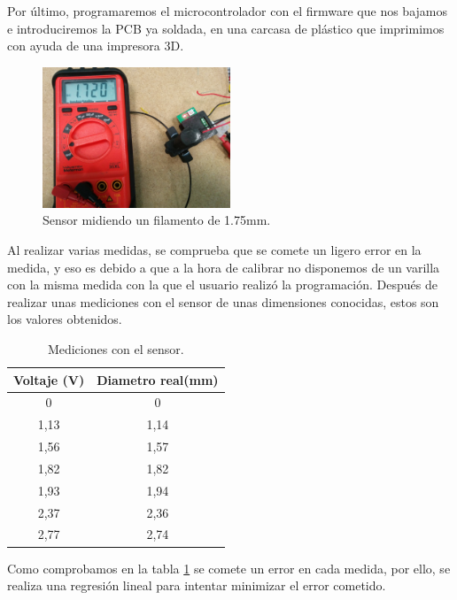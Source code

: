 Por último, programaremos el microcontrolador con el firmware que nos bajamos e introduciremos la PCB ya soldada, en una carcasa de plástico que imprimimos con ayuda de una impresora 3D.
\begin{figure}[H]
    \centering
    \includegraphics[width=0.5\textwidth]{images/sensor/IMG_20150417_134451.jpg}
    \caption{Sensor midiendo un filamento de 1.75mm.}
    \label{fig:sens_midiendo}
\end{figure}

Al realizar varias medidas, se comprueba que se comete un ligero error en la medida, y eso es debido a que a la hora de calibrar no disponemos de un varilla con la misma medida con la que el usuario realizó la programación. Después de realizar unas mediciones con el sensor de unas dimensiones conocidas, estos son los valores obtenidos.

\begin{table}[H]
    \centering

    \begin{tabular}{cc}
        {\bf Voltaje (V)} & {\bf Diametro real(mm)} \\ \hline
        0                 & 0                       \\
        1,13              & 1,14                    \\
        1,56              & 1,57                    \\
        1,82              & 1,82                    \\
        1,93              & 1,94                    \\
        2,37              & 2,36                    \\
        2,77              & 2,74                   
    \end{tabular}
    \caption{Mediciones con el sensor.}
    \label{tab:medici_senso}
\end{table}

Como comprobamos en la tabla \ref{tab:medici_senso} se comete un error en cada medida, por ello, se realiza una regresión lineal para intentar minimizar el error cometido.

